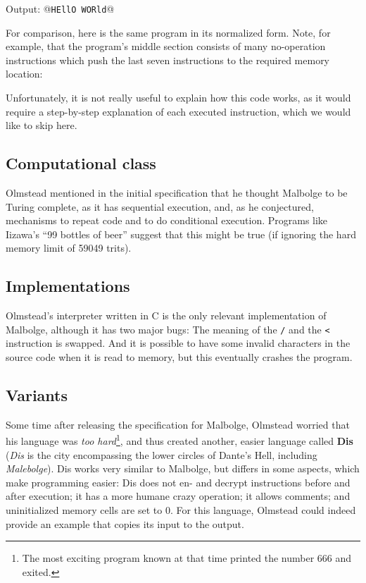 \begin{io}
Output: @\texttt{HEllO WORld}@
\end{io}

For comparison, here is the same program in its normalized form. Note, for example, that the program's middle section consists of many no-operation instructions which push the last seven instructions to the required memory location:



Unfortunately, it is not really useful to explain how this code works, as it would require a step-by-step explanation of each executed instruction, which we would like to skip here.

\subsection{Computational class}

Olmstead mentioned in the initial specification that he thought Malbolge to be Turing complete, as it has sequential execution, and, as he conjectured, mechanisms to repeat code and to do conditional execution. Programs like Iizawa's “99 bottles of beer” suggest that this might be true (if ignoring the hard memory limit of 59049 trits).

\subsection{Implementations}

Olmstead's interpreter written in C \cite{olmstead1998malbolge} is the only relevant implementation of Malbolge, although it has two major bugs: The meaning of the \texttt{/} and the \texttt{<} instruction is swapped. And it is possible to have some invalid characters in the source code when it is read to memory, but this eventually crashes the program.

\subsection{Variants}

Some time after releasing the specification for Malbolge, Olmstead worried that his language was \emph{too hard}\footnote{The most exciting program known at that time printed the number 666 and exited.}, and thus created another, easier language called \textbf{Dis} (\emph{Dis} is the city encompassing the lower circles of Dante's Hell, including \emph{Malebolge}). Dis works very similar to Malbolge, but differs in some aspects, which make programming easier: Dis does not en- and decrypt instructions before and after execution; it has a more humane crazy operation; it allows comments; and uninitialized memory cells are set to 0. For this language, Olmstead could indeed provide an example that copies its input to the output.


